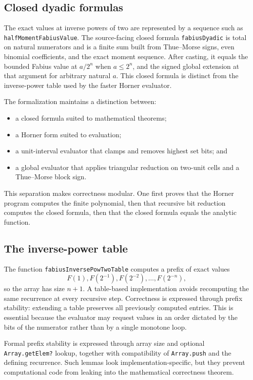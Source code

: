 \documentclass[11pt,oneside]{article}
\theoremstyle{definition}
\theoremstyle{remark}
\begin{document}
\subsection{Closed dyadic formulas}
The exact values at inverse powers of two are represented by a sequence such as \nolinkurl{halfMomentFabiusValue}.  The source-facing closed formula \nolinkurl{fabiusDyadic} is total on natural numerators and is a finite sum built from Thue--Morse signs, even binomial coefficients, and the exact moment sequence.  After casting, it equals the bounded Fabius value at \(a/2^n\) when \(a\leq2^n\), and the signed global extension at that argument for arbitrary natural \(a\).  This closed formula is distinct from the inverse-power table used by the faster Horner evaluator.

The formalization maintains a distinction between:
\begin{itemize}
  \item a closed formula suited to mathematical theorems;
  \item a Horner form suited to evaluation;
  \item a unit-interval evaluator that clamps and removes highest set bits; and
  \item a global evaluator that applies triangular reduction on two-unit cells and a Thue--Morse block sign.
\end{itemize}
This separation makes correctness modular.  One first proves that the Horner program computes the finite polynomial, then that recursive bit reduction computes the closed formula, then that the closed formula equals the analytic function.

\subsection{The inverse-power table}
The function \nolinkurl{fabiusInversePowTwoTable} computes a prefix of exact values
\[
  F(1),F(2^{-1}),F(2^{-2}),\ldots,F(2^{-n}),
\]
so the array has size \(n+1\).  A table-based implementation avoids recomputing the same recurrence at every recursive step.  Correctness is expressed through prefix stability: extending a table preserves all previously computed entries.  This is essential because the evaluator may request values in an order dictated by the bits of the numerator rather than by a single monotone loop.

Formal prefix stability is expressed through array size and optional
\nolinkurl{Array.getElem?} lookup, together with compatibility of
\nolinkurl{Array.push} and the defining recurrence.
Such lemmas look implementation-specific, but they prevent computational code from leaking into the mathematical correctness theorem.
\end{document}
